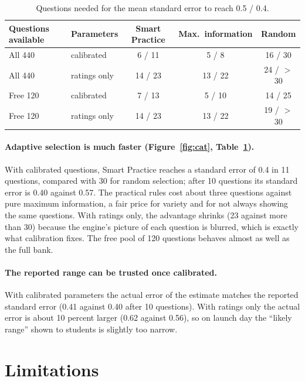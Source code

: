 \documentclass[11pt,a4paper]{article}
\begin{document}
\begin{table}[h]
\centering
\begin{tabular}{llccc}
\toprule
Questions available & Parameters & Smart Practice & Max.\ information & Random \\
\midrule
All 440 & calibrated & 6 / 11 & 5 / 8 & 16 / 30 \\
All 440 & ratings only & 14 / 23 & 13 / 22 & 24 / $>$30 \\
Free 120 & calibrated & 7 / 13 & 5 / 10 & 14 / 25 \\
Free 120 & ratings only & 14 / 23 & 13 / 22 & 19 / $>$30 \\
\bottomrule
\end{tabular}
\caption{Questions needed for the mean standard error to reach 0.5 / 0.4.}
\label{tab:cat}
\end{table}

\paragraph{Adaptive selection is much faster (Figure~\ref{fig:cat}, Table~\ref{tab:cat}).} With calibrated questions, Smart Practice reaches a standard error of 0.4 in 11 questions, compared with 30 for random selection; after 10 questions its standard error is 0.40 against 0.57. The practical rules cost about three questions against pure maximum information, a fair price for variety and for not always showing the same questions. With ratings only, the advantage shrinks (23 against more than 30) because the engine's picture of each question is blurred, which is exactly what calibration fixes. The free pool of 120 questions behaves almost as well as the full bank.

\paragraph{The reported range can be trusted once calibrated.} With calibrated parameters the actual error of the estimate matches the reported standard error (0.41 against 0.40 after 10 questions). With ratings only the actual error is about 10 percent larger (0.62 against 0.56), so on launch day the ``likely range'' shown to students is slightly too narrow.

\section{Limitations}
\end{document}
